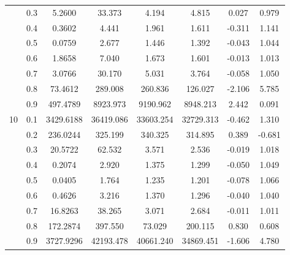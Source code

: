 \documentclass[11pt,a4paper]{report}
\begin{document}
\begin{longtable}{ | c | c || c | c | c | c | c | c | }
 & 0.3 & 5.2600 & 33.373 & 4.194 & 4.815 & 0.027 & 0.979 \\
 & 0.4 & 0.3602 & 4.441 & 1.961 & 1.611 & -0.311 & 1.141 \\
 & 0.5 & 0.0759 & 2.677 & 1.446 & 1.392 & -0.043 & 1.044 \\
 & 0.6 & 1.8658 & 7.040 & 1.673 & 1.601 & -0.013 & 1.013 \\
 & 0.7 & 3.0766 & 30.170 & 5.031 & 3.764 & -0.058 & 1.050 \\
 & 0.8 & 73.4612 & 289.008 & 260.836 & 126.027 & -2.106 & 5.785 \\
 & 0.9 & 497.4789 & 8923.973 & 9190.962 & 8948.213 & 2.442 & 0.091 \\
 \hline
\multirow{9}{*}{10} & 0.1 & 3429.6188 & 36419.086 & 33603.254 & 32729.313 & -0.462 & 1.310 \\
 & 0.2 & 236.0244 & 325.199 & 340.325 & 314.895 & 0.389 & -0.681 \\
 & 0.3 & 20.5722 & 62.532 & 3.571 & 2.536 & -0.019 & 1.018 \\
 & 0.4 & 0.2074 & 2.920 & 1.375 & 1.299 & -0.050 & 1.049 \\
 & 0.5 & 0.0405 & 1.764 & 1.235 & 1.201 & -0.078 & 1.066 \\
 & 0.6 & 0.4626 & 3.216 & 1.370 & 1.296 & -0.040 & 1.040 \\
 & 0.7 & 16.8263 & 38.265 & 3.071 & 2.684 & -0.011 & 1.011 \\
 & 0.8 & 172.2874 & 397.550 & 73.029 & 200.115 & 0.830 & 0.608 \\
 & 0.9 & 3727.9296 & 42193.478 & 40661.240 & 34869.451 & -1.606 & 4.780 \\
 \hline
\hline
\end{longtable}
\end{document}
